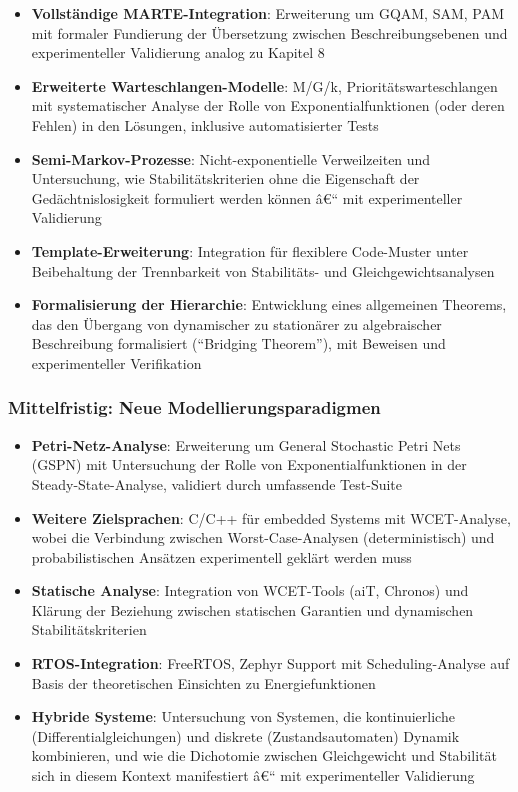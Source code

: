 ﻿\documentclass[a4paper,12pt]{scrreprt}
\theoremstyle{definition}
\begin{document}
\begin{itemize}
	\item[-] \textbf{Vollständige MARTE-Integration}: Erweiterung um GQAM, SAM, PAM mit formaler Fundierung der Übersetzung zwischen Beschreibungsebenen und experimenteller Validierung analog zu Kapitel 8
	
	\item[-] \textbf{Erweiterte Warteschlangen-Modelle}: M/G/k, Prioritätswarteschlangen mit systematischer Analyse der Rolle von Exponentialfunktionen (oder deren Fehlen) in den Lösungen, inklusive automatisierter Tests
	
	\item[-] \textbf{Semi-Markov-Prozesse}: Nicht-exponentielle Verweilzeiten und Untersuchung, wie Stabilitätskriterien ohne die Eigenschaft der Gedächtnislosigkeit formuliert werden können â€“ mit experimenteller Validierung
	
	\item[-] \textbf{Template-Erweiterung}: Integration für flexiblere Code-Muster unter Beibehaltung der Trennbarkeit von Stabilitäts- und Gleichgewichtsanalysen
	
	\item[-] \textbf{Formalisierung der Hierarchie}: Entwicklung eines allgemeinen Theorems, das den Übergang von dynamischer zu stationärer zu algebraischer Beschreibung formalisiert (``Bridging Theorem''), mit Beweisen und experimenteller Verifikation
\end{itemize}

\subsubsection{Mittelfristig: Neue Modellierungsparadigmen}

\begin{itemize}
	\item[-] \textbf{Petri-Netz-Analyse}: Erweiterung um General Stochastic Petri Nets (GSPN) mit Untersuchung der Rolle von Exponentialfunktionen in der Steady-State-Analyse, validiert durch umfassende Test-Suite
	
	\item[-] \textbf{Weitere Zielsprachen}: C/C++ für embedded Systems mit WCET-Analyse, wobei die Verbindung zwischen Worst-Case-Analysen (deterministisch) und probabilistischen Ansätzen experimentell geklärt werden muss
	
	\item[-] \textbf{Statische Analyse}: Integration von WCET-Tools (aiT, Chronos) und Klärung der Beziehung zwischen statischen Garantien und dynamischen Stabilitätskriterien
	
	\item[-] \textbf{RTOS-Integration}: FreeRTOS, Zephyr Support mit Scheduling-Analyse auf Basis der theoretischen Einsichten zu Energiefunktionen
	
	\item[-] \textbf{Hybride Systeme}: Untersuchung von Systemen, die kontinuierliche (Differentialgleichungen) und diskrete (Zustandsautomaten) Dynamik kombinieren, und wie die Dichotomie zwischen Gleichgewicht und Stabilität sich in diesem Kontext manifestiert â€“ mit experimenteller Validierung
\end{itemize}
\end{document}
